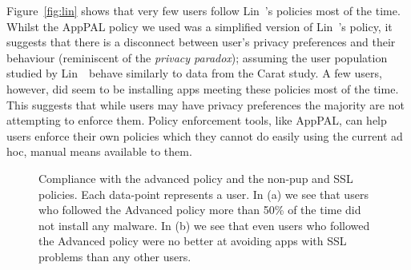 \documentclass[]{llncs}
\begin{document}
Figure~\ref{fig:lin} shows that very few users follow Lin~\etal's policies most of the time.
Whilst the AppPAL policy we used was a simplified version of Lin~\etal's policy, it suggests that there is a disconnect between user's privacy preferences and their behaviour (reminiscent of the \emph{privacy paradox}); assuming the user population studied by Lin~\etal~behave similarly to data from the Carat study.
A few users, however, did seem to be installing apps meeting these policies most of the time.
This suggests that while users may have privacy preferences the majority are not attempting to enforce them.
Policy enforcement tools, like AppPAL, can help users enforce their own policies which they cannot do easily using the current ad hoc, manual  means available to them.

\begin{figure}\centering
    \caption{Compliance with the advanced policy and the non-\ac{pup} and SSL policies.  Each data-point represents a user.  In (a) we see that users who followed the Advanced policy more than 50\% of the time did not install any malware.  In (b) we see that even users who followed the Advanced policy were no better at avoiding apps with SSL problems than any other users.}
  \label{fig:versus}
\end{figure}
\end{document}
